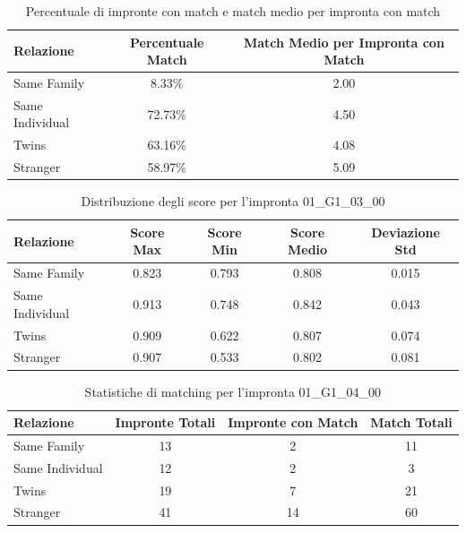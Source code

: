 \begin{table}[htbp]
\centering
\caption{Percentuale di impronte con match e match medio per impronta con match}
\label{tab:match_percentage_01_G1_03_00}
\begin{tabular}{|l|c|c|}
\hline
\textbf{Relazione} & \textbf{Percentuale Match} & \textbf{Match Medio per Impronta con Match} \\
\hline
Same Family & 8.33\% & 2.00 \\
\hline
Same Individual & 72.73\% & 4.50 \\
\hline
Twins & 63.16\% & 4.08 \\
\hline
Stranger & 58.97\% & 5.09 \\
\hline
\end{tabular}
\end{table}


\begin{table}[htbp]
\centering
\caption{Distribuzione degli score per l'impronta 01\_G1\_03\_00}
\label{tab:scores_01_G1_03_00}
\begin{tabular}{|l|c|c|c|c|}
\hline
\textbf{Relazione} & \textbf{Score Max} & \textbf{Score Min} & \textbf{Score Medio} & \textbf{Deviazione Std} \\
\hline
Same Family & 0.823 & 0.793 & 0.808 & 0.015 \\
\hline
Same Individual & 0.913 & 0.748 & 0.842 & 0.043 \\
\hline
Twins & 0.909 & 0.622 & 0.807 & 0.074 \\
\hline
Stranger & 0.907 & 0.533 & 0.802 & 0.081 \\
\hline
\end{tabular}
\end{table}


\begin{table}[htbp]
\centering
\caption{Statistiche di matching per l'impronta 01\_G1\_04\_00}
\label{tab:results_01_G1_04_00}
\begin{tabular}{|l|c|c|c|}
\hline
\textbf{Relazione} & \textbf{Impronte Totali} & \textbf{Impronte con Match} & \textbf{Match Totali} \\
\hline
Same Family & 13 & 2 & 11 \\
\hline
Same Individual & 12 & 2 & 3 \\
\hline
Twins & 19 & 7 & 21 \\
\hline
Stranger & 41 & 14 & 60 \\
\hline
\end{tabular}
\end{table}


